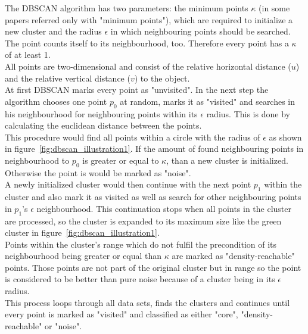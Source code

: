 \documentclass[lnicst,a4paper]{svmultln}
\begin{document}
The DBSCAN algorithm has two parameters: the minimum points $\kappa$ (in some papers referred only with "minimum points"), which are required to initialize a new cluster and the radius $\epsilon$ in which neighbouring points should be searched.
\\
The point counts itself to its neighbourhood, too. Therefore every point has a $\kappa$ of at least 1.
\\
All points are two-dimensional and consist of the relative horizontal distance ($u$) and the relative vertical distance ($v$) to the object.
\\
At first DBSCAN marks every point as "unvisited". In the next step the algorithm chooses one point $p_0$ at random, marks it as "visited" and searches in his neighbourhood for neighbouring points within its $\epsilon$ radius. This is done by calculating the euclidean distance between the points.
\\
This procedure would find all points within a circle with the radius of $\epsilon$ as shown in figure~\ref{fig:dbscan_illustration1}. If the amount of found neighbouring points in neighbourhood to $p_0$ is greater or equal to $\kappa$, than a new cluster is initialized. Otherwise the point is would be marked as "noise".
\\
A newly initialized cluster would then continue with the next point $p_1$ within the cluster and also mark it as visited as well as search for other neighbouring points in $p_1$'s $\epsilon$ neighbourhood. This continuation stops when all points in the cluster are processed, so the cluster is expanded to its maximum size like the green cluster in figure~\ref{fig:dbscan_illustration1}.
\\
Points within the cluster's range which do not fulfil the precondition of its neighbourhood being greater or equal than $\kappa$ are marked as "density-reachable" points. Those points are not part of the original cluster but in range so the point is considered to be better than pure noise because of a cluster being in its $\epsilon$ radius.
\\
This process loops through all data sets, finds the clusters and continues until every point is marked as "visited" and classified as either "core", "density-reachable" or "noise".
\end{document}
